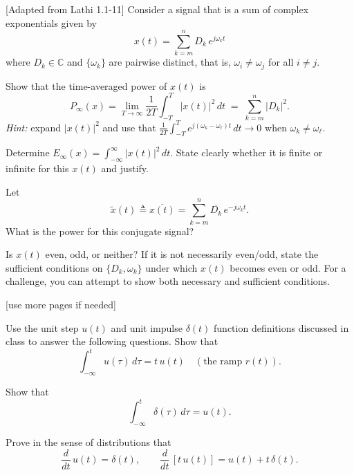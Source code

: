 \documentclass{ee102_pset}
\author{\rule{3cm}{0.4pt}} %
\begin{document}
[Adapted from Lathi 1.1-11] Consider a signal that is a sum of complex exponentials given by
\[
x(t)=\sum_{k=m}^{n} D_k\,e^{j\omega_k t}\!
\]
where $D_k\in\mathbb{C}$ and $\{\omega_k\}$ are pairwise distinct, that is, $\omega_i \neq \omega_j$ for all $i \neq j$.

\problempart{[5 points]} Show that the time-averaged power of $x(t)$ is
  \[
  P_\infty(x)=\lim_{T\to\infty}\frac{1}{2T}\int_{-T}^{T}|x(t)|^2\,dt
  \;=\;\sum_{k=m}^{n}|D_k|^2.
  \]
  \emph{Hint:} expand $|x(t)|^2$ and use that $\frac{1}{2T}\!\int_{-T}^{T}\!e^{j(\omega_k-\omega_\ell)t}\,dt\to 0$ when $\omega_k\neq\omega_\ell$.

\problempart{[5 points]} Determine $E_\infty(x)=\int_{-\infty}^{\infty}|x(t)|^2\,dt$. State clearly whether it is finite or infinite for this $x(t)$ and justify.

\problempart{[5 points]} Let
  \[
  \tilde{x}(t)\triangleq \overline{x(t)}=\sum_{k=m}^{n}\overline{D_k}\,e^{-j\omega_k t}.
  \] What is the power for this conjugate signal?

\problempart{[5 points]} Is $x(t)$ even, odd, or neither? If it is not necessarily even/odd, state the sufficient conditions on $\{D_k,\omega_k\}$ under which $x(t)$ becomes even or odd. For a challenge, you can attempt to show both necessary and sufficient conditions.
\vspace*{\fill}
\begin{center}
[use more pages if needed]
\end{center}


 Use the unit step $u(t)$ and unit impulse $\delta(t)$ function definitions discussed in class to answer the following questions.
\problempart{[5 points]} Show that
  \[
  \int_{-\infty}^{t} u(\tau)\,d\tau = t\,u(t) \quad (\text{the ramp } r(t)).
  \]

\problempart{[5 points]} Show that
  \[
  \int_{-\infty}^{t}\delta(\tau)\,d\tau = u(t).
  \]

\problempart{[5 points]} Prove in the sense of distributions that
  \[
  \frac{d}{dt}\,u(t)=\delta(t),\qquad \frac{d}{dt}\,[t\,u(t)] = u(t) + t\,\delta(t).
  \]

\end{document}

